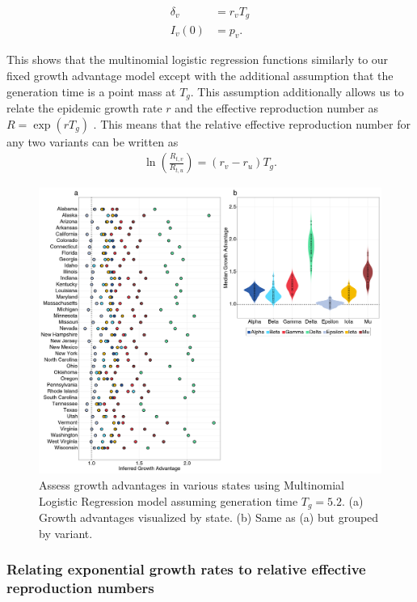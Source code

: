 \documentclass[11pt,oneside,letterpaper]{article}
\begin{document}
\begin{align}
  \delta_{v} &= r_{v}T_{g}\\
  I_{v}(0) &= p_{v}.
\end{align}

This shows that the multinomial logistic regression functions similarly to our fixed growth advantage model except with the additional assumption that the generation time is a point mass at $T_{g}$.
This assumption additionally allows us to relate the epidemic growth rate $r$ and the effective reproduction number as $R = \exp(r T_{g})$ \cite{Wallinga2006}. This means that the relative effective reproduction number for any two variants can be written as
\begin{align*}
\ln \left( \frac{R_{t,v}}{R_{t,u}} \right) = (r_{v} - r_{u}) T_{g}.
\end{align*}



\begin{figure}
  \centering
  \includegraphics[width=\linewidth]{figs/fig_MLR_growth_advantages_supp.png}
  \caption{Assess growth advantages in various states using Multinomial Logistic Regression model assuming generation time $T_{g} = 5.2$.
  (a) Growth advantages visualized by state.
  (b) Same as (a) but grouped by variant.}%
  \label{fig:MLR_growth_advantages}
\end{figure}

\subsubsection*{Relating exponential growth rates to relative effective reproduction numbers}
\end{document}
